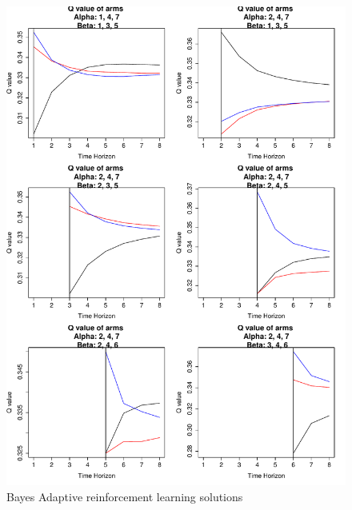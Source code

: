 \documentclass[11pt,a4,singlespacing,titlepagenumber=on]{scrreprt}
\numberwithin{equation}{chapter} %
\theoremstyle{remark}
\begin{document}
\begin{figure}[p]
    \centering
    \includegraphics[scale=0.7]{BARLillustration.pdf}
    \caption{Bayes Adaptive reinforcement learning solutions}
\end{figure}
\end{document}
